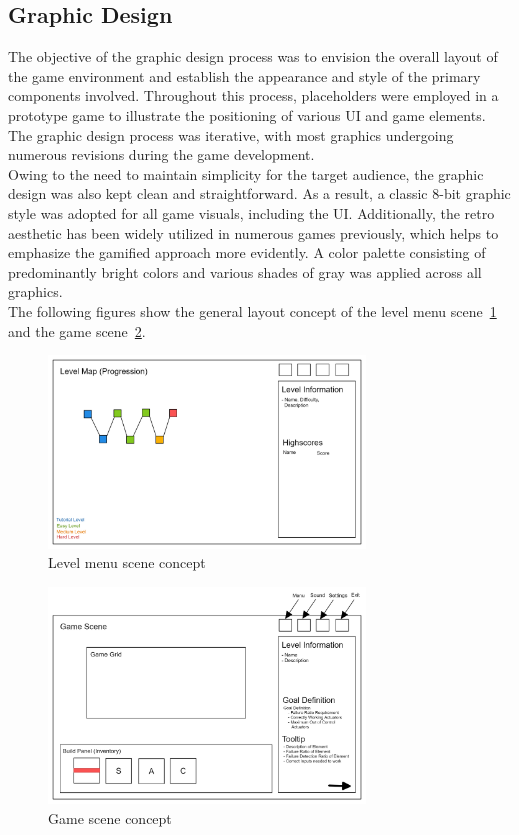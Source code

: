 \subsection{Graphic Design}\label{subsec:graphic-design}
The objective of the graphic design process was to envision the overall layout of the game environment and establish the
appearance and style of the primary components involved.
Throughout this process, placeholders were employed in a prototype game to illustrate the positioning of various UI and game elements.
The graphic design process was iterative, with most graphics undergoing numerous revisions during the game development.
\\
Owing to the need to maintain simplicity for the target audience, the graphic design was also kept clean and straightforward.
As a result, a classic 8-bit graphic style was adopted for all game visuals, including the UI. Additionally,
the retro aesthetic has been widely utilized in numerous games previously, which helps to emphasize the gamified approach more evidently.
A color palette consisting of predominantly bright colors and various shades of gray was applied across all graphics.
\\
The following figures show the general layout concept of the level
menu scene~\ref{fig:level-menu-scene-concept} and the game scene~\ref{fig:game-scene-concept}.
\begin{figure}
    \includegraphics[width=0.75\textwidth]{Pictures/res/concept/level-menu-scene-concept}
    \caption{Level menu scene concept}
    \label{fig:level-menu-scene-concept}
\end{figure}
\begin{figure}
    \includegraphics[width=0.75\textwidth]{Pictures/res/concept/game-scene-concept}
    \caption{Game scene concept}
    \label{fig:game-scene-concept}
\end{figure}

